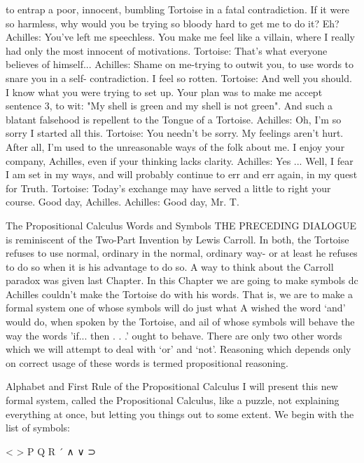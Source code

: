        to entrap a poor, innocent, bumbling Tortoise in a fatal contradiction. If it were so
       harmless, why would you be trying so bloody hard to get me to do it? Eh?
Achilles: You've left me speechless. You make me feel like a villain, where I really had
       only the most innocent of motivations.
Tortoise: That's what everyone believes of himself...
Achilles: Shame on me-trying to outwit you, to use words to snare you in a self-
       contradiction. I feel so rotten.
Tortoise: And well you should. I know what you were trying to set up. Your plan was to
       make me accept sentence 3, to wit: "My shell is green and my shell is not green".
       And such a blatant falsehood is repellent to the Tongue of a Tortoise.
Achilles: Oh, I'm so sorry I started all this.
Tortoise: You needn't be sorry. My feelings aren't hurt. After all, I'm used to the
       unreasonable ways of the folk about me. I enjoy your company, Achilles, even if
       your thinking lacks clarity.
Achilles: Yes ... Well, I fear I am set in my ways, and will probably continue to err and
       err again, in my quest for Truth.
Tortoise: Today's exchange may have served a little to right your course. Good day,
       Achilles.
Achilles: Good day, Mr. T.


                      The Propositional Calculus
                                  Words and Symbols
THE PRECEDING DIALOGUE is reminiscent of the Two-Part Invention by Lewis
Carroll. In both, the Tortoise refuses to use normal, ordinary in the normal, ordinary way-
or at least he refuses to do so when it is his advantage to do so. A way to think about the
Carroll paradox was given last Chapter. In this Chapter we are going to make symbols dc
Achilles couldn't make the Tortoise do with his words. That is, we are to make a formal
system one of whose symbols will do just what A wished the word `and' would do, when
spoken by the Tortoise, and ail of whose symbols will behave the way the words 'if... then
. . .' ought to behave. There are only two other words which we will attempt to deal with
`or' and `not'. Reasoning which depends only on correct usage of these words is termed
propositional reasoning.

            Alphabet and First Rule of the Propositional Calculus
I will present this new formal system, called the Propositional Calculus, like a puzzle, not
explaining everything at once, but letting you things out to some extent. We begin with
the list of symbols:

                                   <    >
                              P    Q    R      ´
                              ∧    ∨    ⊃     ~

